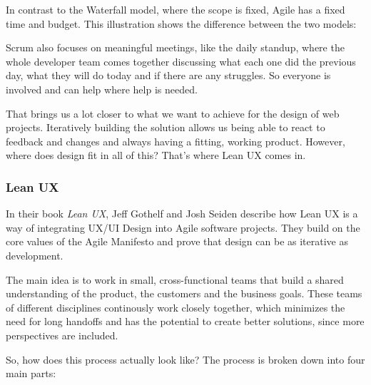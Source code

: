 In contrast to the Waterfall model, where the scope is fixed, Agile has a fixed time and budget.
This illustration shows the difference between the two models:

Scrum also focuses on meaningful meetings, like the daily standup, where the whole developer team
comes together discussing what each one did the previous day, what they will do today and if there
are any struggles. So everyone is involved and can help where help is needed.


That brings us a lot closer to what we want to achieve for the design of web projects. Iteratively
building the solution allows us being able to react to feedback and changes and always having a
fitting, working product. However, where does design fit in all of this? That's where Lean UX comes
in.

\subsubsection{Lean UX}

In their book \textit{Lean UX}, Jeff Gothelf and Josh Seiden describe how Lean UX is a way of
integrating UX/UI Design into Agile software projects. They build on the core values of the Agile
Manifesto and prove that design can be as iterative as development.  

The main idea is to work in small, cross-functional teams that build a shared understanding of the
product, the customers and the business goals. These teams of different disciplines continously work
closely together, which minimizes the need for long handoffs and has the potential to create better
solutions, since more perspectives are included. 

So, how does this process actually look like? The process is broken down into four main parts:


